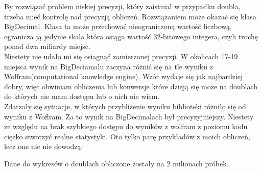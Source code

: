 \documentclass[10pt]{article}
\begin{document}
\begin{center}
\end{center}
By rozwiązać problem niskiej precyzji, który zaistniał w przypadku doubla, trzeba mieć kontrolę nad precyzją obliczeń. Rozwiązaniem może okazać się klasa BigDecimal. Klasa ta może przechować nieograniczoną 
wartość liczbową, ogranicza ją jedynie skala która osiąga wartość 32-bitowego integera, czyli trochę 
ponad dwa miliardy miejsc. \\
Niestety nie udało mi się osiagnąć zamierzonej precyzji. W okolicach 17-19 miejsca wynik na BigDeciamalu zaczyna różnić się na tle wyniku z Wolfram(computational knowledge engine). Wzór wydaje się jak najbardziej dobry, więc obwiniam obliczenia lub konwersje które dzieją się może na doublach do których nie mam dostępu lub o nich nie wiem.\\

Zdarzały się sytuacje, w których przybliżenie wyniku biblioteki różniło się od wyniku z Woflram. Za to wynik na BigDecimalach był precyzyjniejszy. Niestety ze względu na brak szybkiego dostępu do wyników z wolfram z poziomu kodu ciężko stworzyć realne statystyki. Oto tylko parę przykładów z moich obliczeń, lecz one nic nie dowodzą:

\begin{center}
\end{center}








Dane do wykresów o doublach obliczone zostały na 2 milionach próbek.
\end{document}
